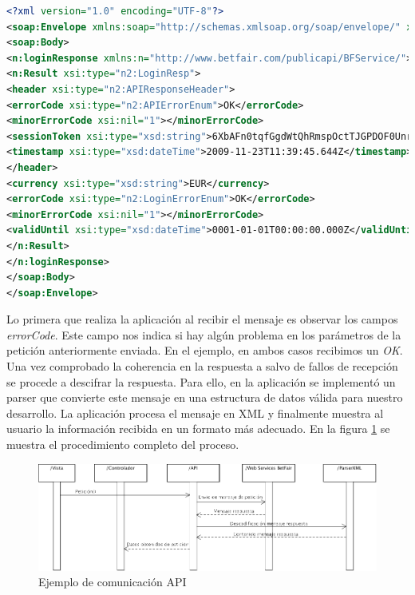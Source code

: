 \begin{lstlisting}[frame=single, language=xml,basicstyle=\small, keywordstyle = \color{blue}] 
<?xml version="1.0" encoding="UTF-8"?>
<soap:Envelope xmlns:soap="http://schemas.xmlsoap.org/soap/envelope/" xmlns:xsi="http://www.w3.org/2001/XMLSchema-instance" xmlns:n2="http://www.betfair.com/publicapi/types/" xmlns:xsd="http://www.w3.org/2001/XMLSchema">
<soap:Body>
<n:loginResponse xmlns:n="http://www.betfair.com/publicapi/BFService/">
<n:Result xsi:type="n2:LoginResp">
<header xsi:type="n2:APIResponseHeader">
<errorCode xsi:type="n2:APIErrorEnum">OK</errorCode>
<minorErrorCode xsi:nil="1"></minorErrorCode>
<sessionToken xsi:type="xsd:string">6XbAFn0tqfGgdWtQhRmspOctTJGPDOF0Unr2+5WWngk=</sessionToken>
<timestamp xsi:type="xsd:dateTime">2009-11-23T11:39:45.644Z</timestamp>
</header>
<currency xsi:type="xsd:string">EUR</currency>
<errorCode xsi:type="n2:LoginErrorEnum">OK</errorCode>
<minorErrorCode xsi:nil="1"></minorErrorCode>
<validUntil xsi:type="xsd:dateTime">0001-01-01T00:00:00.000Z</validUntil>
</n:Result>
</n:loginResponse>
</soap:Body>
</soap:Envelope>
 \end{lstlisting}
 
  Lo primera que realiza la aplicación al recibir el mensaje es observar los campos \emph{errorCode}. Este campo nos indica si hay algún problema en los parámetros de la petición anteriormente enviada. En el ejemplo, en ambos casos recibimos un \emph{OK}. Una vez comprobado la coherencia en la respuesta a salvo de fallos de recepción se procede a descifrar la respuesta. Para ello, en la aplicación se implementó un parser que convierte este mensaje en una estructura de datos válida para nuestro desarrollo.  La aplicación procesa el mensaje en XML y finalmente muestra al usuario la información recibida en un formato más adecuado. En la figura \ref{fig:proceso} se muestra el procedimiento completo del proceso.
       
 \begin{figure}[h!]
    \centering
       \includegraphics[width=1.2\textwidth]{./images/modelo_accion.png}
     \caption{Ejemplo de comunicación API }
   \label{fig:proceso}
\end{figure}
 
